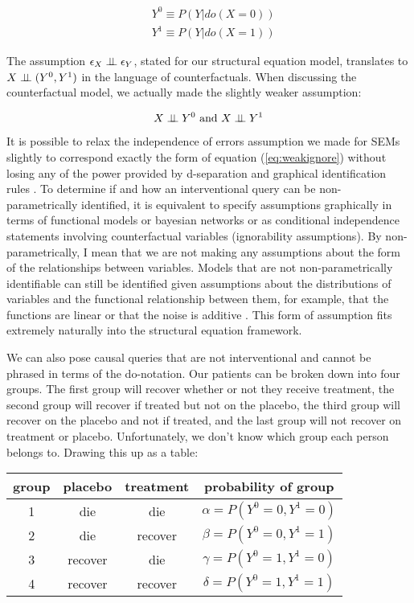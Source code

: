 \documentclass[11pt,a4paper]{article}
\begin{document}
\begin{equation}
\begin{aligned}
&Y^{0} \equiv P(Y|do(X=0)) \\
&Y^{1} \equiv P(Y|do(X=1))
\end{aligned}
\end{equation}

The assumption $\epsilon_{X} \perp\!\!\!\perp \epsilon_{Y}$, stated for our structural equation model, translates to $X \perp\!\!\!\perp (Y^{0},Y^{1})$ in the language of counterfactuals. When discussing the counterfactual model, we actually made the slightly weaker assumption:

\begin{equation}
\label{eq:weakignore}
X \perp\!\!\!\perp Y^{0} \text{ and } X \perp\!\!\!\perp Y^{1}
\end{equation}

It is possible to relax the independence of errors assumption we made for SEMs slightly to correspond exactly the form of equation (\ref{eq:weakignore}) without losing any of the power provided by d-separation and graphical identification rules \cite{Richardson2013}. To determine if and how an interventional query can be non-parametrically identified, it is equivalent to specify assumptions graphically in terms of functional models or bayesian networks or as conditional independence statements involving counterfactual variables (ignorability assumptions). By non-parametrically, I mean that we are not making any assumptions about the form of the relationships between variables. Models that are not non-parametrically identifiable can still be identified given assumptions about the distributions of variables and the functional relationship between them, for example, that the functions are linear or that the noise is additive \cite{Peters2014}. This form of assumption fits extremely naturally into the structural equation framework. 

We can also pose causal queries that are not interventional and cannot be phrased in terms of the do-notation. Our patients can be broken down into four groups. The first group will recover whether or not they receive treatment, the second group will recover if treated but not on the placebo, the third group will recover on the placebo and not if treated, and the last group will not recover on treatment or placebo. Unfortunately, we don't know which group each person belongs to. Drawing this up as a table:

\begin{tabular}{c|c|c|c}
group & placebo & treatment & probability of group\\
\hline
1 & die & die & $\alpha=P(Y^{0}=0,Y^{1}=0)$\\
2 & die & recover & $\beta=P(Y^{0}=0,Y^{1}=1)$\\
3 & recover & die & $\gamma=P(Y^{0}=1,Y^{1}=0)$\\
4 & recover & recover & $\delta=P(Y^{0}=1,Y^{1}=1)$\\
\end{tabular}
\end{document}

